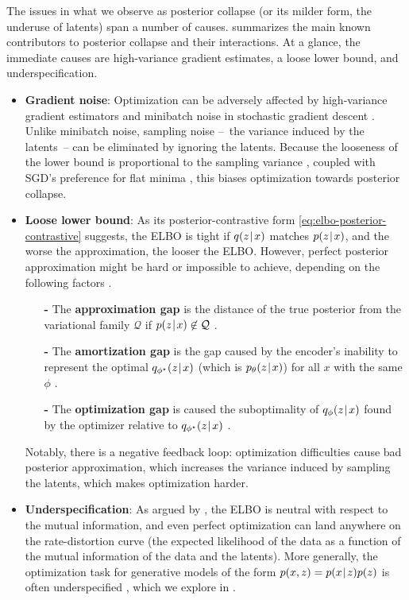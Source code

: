 The issues in what we observe as posterior collapse (or its milder form, the underuse of latents) span a number of causes.
 summarizes the main known contributors to posterior collapse and their interactions.
At a glance, the immediate causes are high-variance gradient estimates, a loose lower bound, and underspecification.
\begin{itemize}
\item \textbf{Gradient noise}:
Optimization can be adversely affected by high-variance gradient estimators \citep{roeder2017sticking,tucker2018doubly} and minibatch noise in stochastic gradient descent \citep{titsias2014doubly}.
Unlike minibatch noise, sampling noise --~the variance induced by the latents~-- can be eliminated by ignoring the latents.
Because the looseness of the lower bound is proportional to the sampling variance \citep{maddison2017filtering}, coupled with SGD's preference for flat minima \citep{hochreiter1995simplifying}, this biases optimization towards posterior collapse.
\item \textbf{Loose lower bound}:
As its posterior-contrastive form \eqref{eq:elbo-posterior-contrastive} suggests, the ELBO is tight if $q(z\hspace{0.08em}|\hspace{0.11em} x)$ matches $p(z\hspace{0.08em}|\hspace{0.11em} x)$, and the worse the approximation, the looser the ELBO.
However, perfect posterior approximation might be hard or impossible to achieve, depending on the following factors \citep{cremer2017reinterpreting}.
\begin{itemize}
\item[\textbf{-}] The \textbf{approximation gap} is the distance of the true posterior from the variational family $\mathcal{Q}$ if $p(z\hspace{0.08em}|\hspace{0.11em} x) \not\in \mathcal{Q}$ \citep{DBLP:conf/nips/ShuBZKE18,razavi2018preventing}.
\item[\textbf{-}] The \textbf{amortization gap} is the gap caused by the encoder's inability to represent the optimal $q_{\phi^\star}(z\hspace{0.08em}|\hspace{0.11em} x)$ (which is $p_\theta(z\hspace{0.08em}|\hspace{0.11em} x)$) for all $x$ with the same $\phi$ \citep{kim2018semi,DBLP:conf/nips/ShuBZKE18}.
\item[\textbf{-}] The \textbf{optimization gap} is caused the suboptimality of $q_\phi(z\hspace{0.08em}|\hspace{0.11em} x)$ found by the optimizer relative to $q_{\phi^\star}(z\hspace{0.08em}|\hspace{0.11em} x)$ \citep{he2018lagging}.
\end{itemize}
Notably, there is a negative feedback loop: optimization difficulties cause bad posterior approximation, which increases the variance induced by sampling the latents, which makes optimization harder.
\item \textbf{Underspecification}: As argued by \citet{alemi2017fixing}, the ELBO is neutral with respect to the mutual information, and even perfect optimization can land anywhere on the rate-distortion curve (the expected likelihood of the data as a function of the mutual information of the data and the latents).
More generally, the optimization task for generative models of the form $p(x,z)= p(x\hspace{0.08em}|\hspace{0.11em} z)p(z)$ is often underspecified \citep{huszar2017representation}, which we explore in .
\end{itemize}

